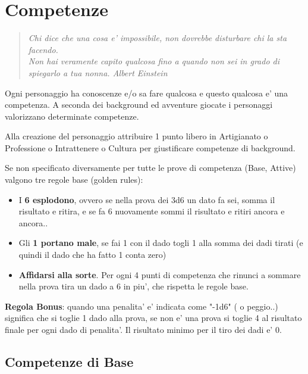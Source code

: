 \documentclass[a4paper,11pt,twoside,openany]{book}
\begin{document}
\pagebreak

\section{Competenze}

\label{competenze}
\begin{quote}\textit{
Chi dice che una cosa e' impossibile, non dovrebbe disturbare chi la sta facendo.\\
Non hai veramente capito qualcosa fino a quando non sei in grado di spiegarlo a tua nonna. Albert Einstein}\end{quote}


Ogni personaggio ha conoscenze e/o sa fare qualcosa e questo qualcosa e' una competenza. A seconda dei background ed avventure giocate i personaggi valorizzano determinate competenze.

Alla creazione del personaggio attribuire 1 punto libero in Artigianato o Professione o Intrattenere o Cultura per giustificare competenze di background.

Se non specificato diversamente per tutte le prove di competenza (Base, Attive) valgono tre regole base  (golden rules):

\begin{itemize}
\item 
I \textbf{6 esplodono}, ovvero se nella prova dei 3d6 un dato fa sei, somma il risultato e ritira, e se fa 6 nuovamente sommi il risultato e ritiri ancora e ancora.. 
\item 
Gli \textbf{1 portano male}, se fai 1 con il dado togli 1 alla somma dei dadi tirati (e quindi il dado che ha fatto 1 conta zero) 
\item 
\textbf{Affidarsi alla sorte}. Per ogni 4 punti di competenza che rinunci a sommare nella prova tira un dado a 6 in piu', che rispetta le regole base. 
\end{itemize}

\textbf{Regola Bonus}: quando una penalita' e' indicata come "-1d6" ( o peggio..) significa che si toglie 1 dado alla prova, se non e' una prova si toglie 4 al risultato finale per ogni dado di penalita'. Il risultato minimo per il tiro dei dadi e' 0.


\subsection{Competenze di Base}
\end{document}
